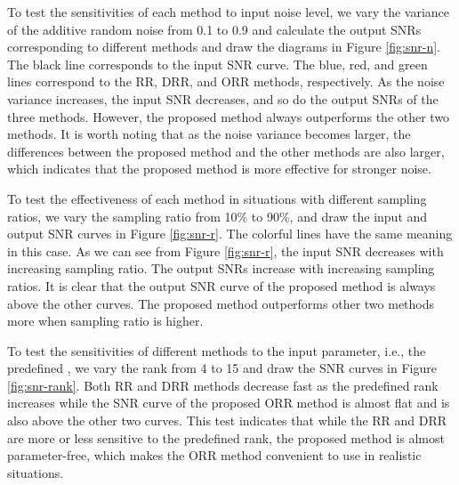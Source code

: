 {{%
%
%

}


To test the sensitivities of each method to input noise level, we vary the variance of the additive random noise from 0.1 to 0.9 and calculate the output SNRs corresponding to different methods and draw the diagrams in Figure \ref{fig:snr-n}. The black line corresponds to the input SNR curve. The blue, red, and green lines correspond to the RR, DRR, and ORR methods, respectively. As the noise variance increases, the input SNR decreases, and so do the output SNRs of the three methods. However, the proposed method always outperforms the other two methods. It is worth noting that as the noise variance becomes larger, the differences between the proposed method and the other methods are also larger, which indicates that the proposed method is more effective for stronger noise.

To test the effectiveness of each method in situations with different sampling ratios, we vary the sampling ratio from 10\% to 90\%, and draw the input and output SNR curves in Figure \ref{fig:snr-r}. The colorful lines have the same meaning in this case. As we can see from Figure \ref{fig:snr-r}, the input SNR decreases with increasing sampling ratio. The output SNRs increase with increasing sampling ratios. It is clear that the output SNR curve of the proposed method is always above the other curves. The proposed method outperforms other two methods more when sampling ratio is higher. 

To test the sensitivities of different methods to the input parameter, i.e., the predefined , we vary the rank from 4 to 15 and draw the SNR curves in Figure \ref{fig:snr-rank}. Both RR and DRR methods decrease fast as the predefined rank increases while the SNR curve of the proposed ORR method is almost flat and is also above the other two curves. This test indicates that while the RR and DRR are more or less sensitive to the predefined rank, the proposed method is almost parameter-free, which makes the ORR method convenient to use in realistic situations. 

}
